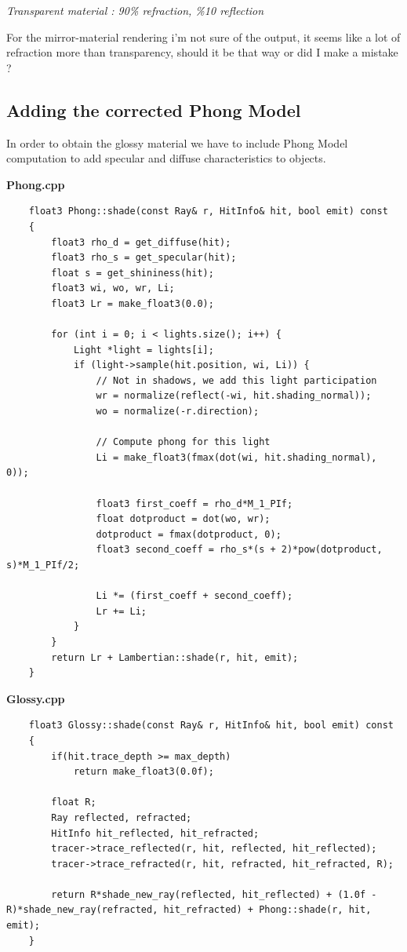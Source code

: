 \documentclass[a4,12pt]{article}
\begin{document}
\begin{center}
\begin{minipage}[b]{0.40\linewidth}
\begin{center}
				\textit{Transparent material : 90\% refraction, \%10 reflection}
			\end{center}
		\end{minipage}
	\end{center}
	
	For the mirror-material rendering i'm not sure of the output, it seems like a lot of refraction more than transparency, should it be that way or did I make a mistake ?
	
	\subsection{Adding the corrected Phong Model}
	In order to obtain the glossy material we have to include Phong Model computation to add specular and diffuse characteristics to objects.
	
	\textbf{Phong.cpp}
	
	\begin{lstlisting}
	float3 Phong::shade(const Ray& r, HitInfo& hit, bool emit) const
	{
		float3 rho_d = get_diffuse(hit);
		float3 rho_s = get_specular(hit);
		float s = get_shininess(hit);
		float3 wi, wo, wr, Li;
		float3 Lr = make_float3(0.0);
		
		for (int i = 0; i < lights.size(); i++) {
			Light *light = lights[i];
			if (light->sample(hit.position, wi, Li)) {
				// Not in shadows, we add this light participation
				wr = normalize(reflect(-wi, hit.shading_normal));
				wo = normalize(-r.direction);
				
				// Compute phong for this light
				Li = make_float3(fmax(dot(wi, hit.shading_normal), 0));
				
				float3 first_coeff = rho_d*M_1_PIf;
				float dotproduct = dot(wo, wr);
				dotproduct = fmax(dotproduct, 0);
				float3 second_coeff = rho_s*(s + 2)*pow(dotproduct, s)*M_1_PIf/2;
				
				Li *= (first_coeff + second_coeff);
				Lr += Li;
			}
		}
		return Lr + Lambertian::shade(r, hit, emit);
	}
	\end{lstlisting}
	
	\textbf{Glossy.cpp}
	\begin{lstlisting}
	float3 Glossy::shade(const Ray& r, HitInfo& hit, bool emit) const
	{
		if(hit.trace_depth >= max_depth)
			return make_float3(0.0f);
		
		float R;
		Ray reflected, refracted;
		HitInfo hit_reflected, hit_refracted;
		tracer->trace_reflected(r, hit, reflected, hit_reflected);
		tracer->trace_refracted(r, hit, refracted, hit_refracted, R);
		
		return R*shade_new_ray(reflected, hit_reflected) + (1.0f - R)*shade_new_ray(refracted, hit_refracted) + Phong::shade(r, hit, emit);
	}
	\end{lstlisting}
	
\end{document}
